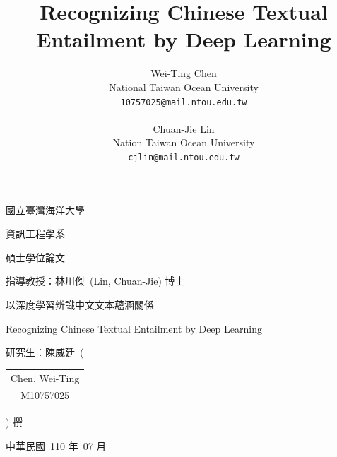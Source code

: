 \documentclass[12pt]{article}
\title{Recognizing Chinese Textual Entailment by Deep Learning}
\author{
  Wei-Ting Chen\\
  National Taiwan Ocean University\\
  \texttt{10757025@mail.ntou.edu.tw}\\
  \\
  Chuan-Jie Lin\\
  Nation Taiwan Ocean University\\
  \texttt{cjlin@mail.ntou.edu.tw}\\
}
\begin{document}
\begin{CJK*}{UTF8}{bkai}

\begin{titlepage}
  \centering
  {\Huge 國立臺灣海洋大學\par}
  \vspace{1cm}
  {\huge 資訊工程學系\par}
  \vspace{1cm}
  {\huge 碩士學位論文\par}
  \vspace{2cm}
  {\LARGE 指導教授：林川傑\ (Lin, Chuan-Jie) 博士\par}
  \vfill
  {\LARGE 以深度學習辨識中文文本蘊涵關係\par}
  {\LARGE Recognizing Chinese Textual Entailment by Deep Learning\par}
  \vfill
  {\LARGE 研究生：陳威廷\ \bigg(
    \begin{tabular}{c}
      Chen, Wei-Ting \\
      M10757025
    \end{tabular}
    \bigg) 撰}
    \vfill
    {\LARGE 中華民國\ 110 年\ 07 月}
\end{titlepage}

\newpage



\end{CJK*}
\end{document}
